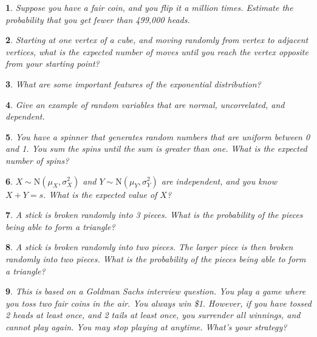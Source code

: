 \documentclass{report}
\newtheorem{problem}{}
\numberwithin{problem}{chapter} %
\begin{document}
\begin{problem}
Suppose you have a fair coin, and you flip it a million times. Estimate the probability that you get fewer than 499,000 heads.
\end{problem}

\begin{problem}
\cite{STRAWA}
Starting at one vertex of a cube, and moving randomly from vertex to adjacent vertices, what is the expected number of moves until you reach the  vertex opposite from your starting point?
\end{problem}

\begin{problem}
What are some important features of the exponential distribution?
\end{problem}

\begin{problem}
Give an example of random variables that are normal, uncorrelated, and dependent.
\end{problem}

\begin{problem}
You have a spinner that generates random numbers that are uniform between 0 and 1. You sum the spins until the sum is greater than one. What is the expected number of spins?
\end{problem}

\begin{problem}
$X \sim \mbox{N}(\mu_X, \sigma^2_X)$ and $Y \sim \mbox{N}(\mu_Y, \sigma^2_Y)$ are independent, and you know $X+Y=s$. What is the expected value of $X$? 
\end{problem}

\begin{problem}
A stick is broken randomly into 3 pieces. What is the probability of the pieces being able to form a triangle?
\end{problem}

\begin{problem}
A stick is broken randomly into two pieces. The larger piece is then broken randomly into two pieces. What is the probability of the pieces being able to form a triangle?
\end{problem}

\begin{problem}
This is based on a Goldman Sachs interview question. You play a game where you toss two fair coins in the air. You always win \$1. However, if you have tossed 2 heads at least once, and 2 tails at least once, you surrender all winnings, and cannot play again. You may stop playing at anytime. What's your strategy? 
\end{problem}
\end{document}
